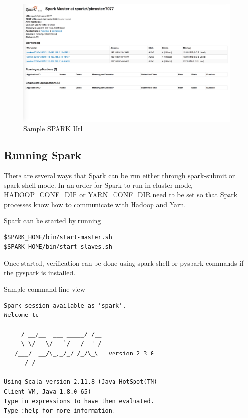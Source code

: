 \begin{figure}[htbp] 
	\centering
	\includegraphics[width=\columnwidth]{images/sparkurl.jpg}
	\caption{Sample SPARK Url}
\label{fig:sparkurl} 
\end{figure}

\subsection{Running Spark}
There are several ways that Spark can be run either through spark-submit or spark-shell mode. In an order for Spark to run in cluster mode, HADOOP\_CONF\_DIR or YARN\_CONF\_DIR need to be set so that Spark processes know how to communicate with Hadoop and Yarn. 

Spark can be started by running
\begin{verbatim}
$SPARK_HOME/bin/start-master.sh
$SPARK_HOME/bin/start-slaves.sh
\end{verbatim}

Once started, verification can be done using spark-shell or pyspark commands if the pyspark is installed.

Sample command line view
\begin{verbatim}
Spark session available as 'spark'.
Welcome to
      ____              __
     / __/__  ___ _____/ /__
    _\ \/ _ \/ _ `/ __/  '_/
   /___/ .__/\_,_/_/ /_/\_\   version 2.3.0
      /_/
         
Using Scala version 2.11.8 (Java HotSpot(TM) 
Client VM, Java 1.8.0_65)
Type in expressions to have them evaluated.
Type :help for more information.
\end{verbatim}

